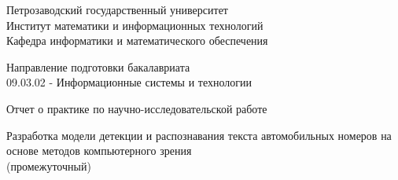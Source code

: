 \documentclass[a4paper,12pt]{article}
\renewcommand{\baselinestretch}{1.50}
\begin{document}

\thispagestyle{empty}
\begin{center}


\renewcommand{\baselinestretch}{1}
{\large
{\sc Петрозаводский государственный университет\\
Институт математики и информационных технологий\\
	Кафедра информатики и математического обеспечения
}
}

\end{center}


\begin{center}
%
%
%
% 
	Направление подготовки бакалавриата \\
    09.03.02 - Информационные системы и технологии  
\end{center}

\vfill

\begin{center}
{\normalsize Отчет о практике по научно-исследовательской работе} \\
\medskip

	{\Large \sc Разработка модели детекции и распознавания текста автомобильных номеров на основе методов компьютерного зрения} \\
	(промежуточный)
\end{center}

\medskip
\end{document}
